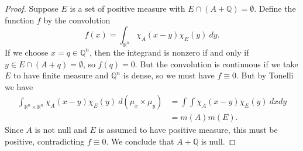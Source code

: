 \documentclass[11pt,letterpaper]{report}
\newcommand{\reals}{\mathbb{R}}
\newcommand{\rationals}{\mathbb{Q}}
\begin{document}
\begin{enumerate}
\begin{proof}
		\noindent Suppose $E$ is a set of positive measure with $E\cap (A+\rationals) = \emptyset$. Define the function $f$ by the convolution
		\[
		f(x) = \int_{\reals^n}\chi_A(x-y)\chi_E(y)\ dy.
		\]
		If we choose $x=q\in \rationals^n$, then the integrand is nonzero if and only if $y\in E\cap (A+q) = \emptyset$, so $f(q) = 0$. But the convolution is continuous if we take $E$ to have finite measure and $\rationals^n$ is dense, so we must have $f \equiv 0$. But by Tonelli we have
		\begin{align*}
		\int_{\reals^n\times \reals^n}\chi_A(x-y)\chi_E(y)\ d(\mu_x\times \mu_y) &= \int \int \chi_A(x-y)\chi_E(y)\ dxdy\\
		&= m(A)m(E).
		\end{align*}
		Since $A$ is not null and $E$ is assumed to have positive measure, this must be positive, contradicting $f\equiv 0$. We conclude that $A+\rationals$ is null.
	\end{proof}
\end{enumerate}
\end{document}
